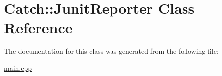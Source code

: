 \hypertarget{class_catch_1_1_junit_reporter}{}\section{Catch\+:\+:Junit\+Reporter Class Reference}
\label{class_catch_1_1_junit_reporter}


The documentation for this class was generated from the following file\+:\begin{DoxyCompactItemize}
\item 
\hyperlink{main_8cpp}{main.\+cpp}\end{DoxyCompactItemize}
